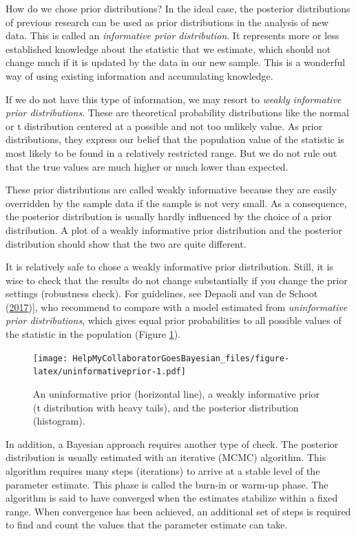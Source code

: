 \documentclass[doc]{apa6}
\begin{document}
How do we chose prior distributions? In the ideal case, the posterior
distributions of previous research can be used as prior distributions in
the analysis of new data. This is called an \emph{informative prior
distribution}. It represents more or less established knowledge about
the statistic that we estimate, which should not change much if it is
updated by the data in our new sample. This is a wonderful way of using
existing information and accumulating knowledge.

If we do not have this type of information, we may resort to
\emph{weakly informative prior distributions}. These are theoretical
probability distributions like the normal or t distribution centered at
a possible and not too unlikely value. As prior distributions, they
express our belief that the population value of the statistic is most
likely to be found in a relatively restricted range. But we do not rule
out that the true values are much higher or much lower than expected.

These prior distributions are called weakly informative because they are
easily overridden by the sample data if the sample is not very small. As
a consequence, the posterior distribution is usually hardly influenced
by the choice of a prior distribution. A plot of a weakly informative
prior distribution and the posterior distribution should show that the
two are quite different.

It is relatively safe to chose a weakly informative prior distribution.
Still, it is wise to check that the results do not change substantially
if you change the prior settings (robustness check). For guidelines, see
Depaoli and van de Schoot
(\protect\hyperlink{ref-depaoliImprovingTransparencyReplication2017}{2017}){]},
who recommend to compare with a model estimated from \emph{uninformative
prior distributions}, which gives equal prior probabilities to all
possible values of the statistic in the population (Figure
\ref{fig:uninformativeprior}).

\begin{figure}
\centering
\texttt{[image: HelpMyCollaboratorGoesBayesian\_files/figure-latex/uninformativeprior-1.pdf]}
\caption{\label{fig:uninformativeprior}An uninformative prior (horizontal
line), a weakly informative prior (t distribution with heavy tails), and
the posterior distribution (histogram).}
\end{figure}

In addition, a Bayesian approach requires another type of check. The
posterior distribution is usually estimated with an iterative (MCMC)
algorithm. This algorithm requires many steps (iterations) to arrive at
a stable level of the parameter estimate. This phase is called the
burn-in or warm-up phase. The algorithm is said to have converged when
the estimates stabilize within a fixed range. When convergence has been
achieved, an additional set of steps is required to find and count the
values that the parameter estimate can take.
\end{document}
